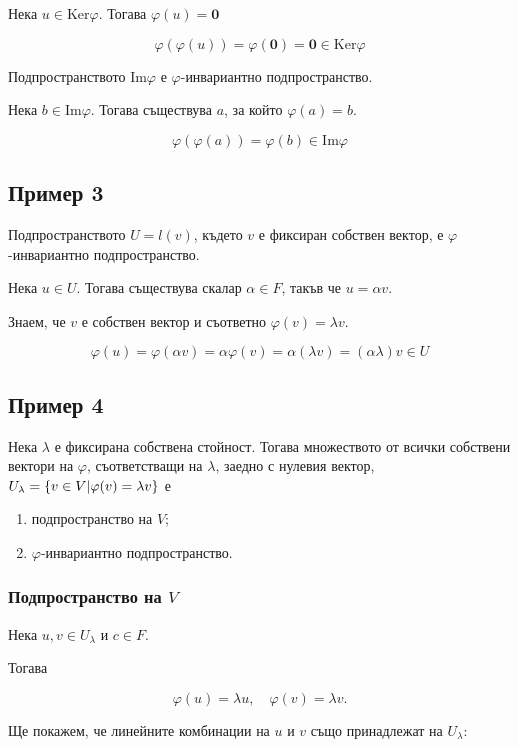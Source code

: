 \documentclass{scrartcl}
\begin{document}
\begin{FlushLeft}
Нека $u \in \text{Ker}\varphi$. Тогава $\varphi(u) = \mathbf{0}$

$$\varphi(\varphi(u)) = \varphi(\mathbf{0}) = \mathbf{0} \in \text{Ker}\varphi$$

Подпространството $\text{Im}\varphi$ е $\varphi$-инвариантно подпространство.

Нека $b \in \text{Im}\varphi$. Тогава съществува $a$, за който $\varphi(a) = b$.

$$\varphi(\varphi(a)) = \varphi(b) \in \text{Im}\varphi$$

\subsection*{Пример 3}

Подпространството $U = l(v)$, където $v$ е фиксиран собствен вектор, е $\varphi$-инвариантно подпространство.

Нека $u \in U$. Тогава съществува скалар $\alpha \in F$, такъв че $u = \alpha v$.

Знаем, че $v$ е собствен вектор и съответно $\varphi(v) = \lambda v$.

$$\varphi(u) = \varphi(\alpha v) = \alpha\varphi(v) = \alpha(\lambda v) = (\alpha\lambda)v \in U$$

\subsection*{Пример 4}

Нека $\lambda$ е фиксирана собствена стойност. Тогава множеството от всички собствени вектори на $\varphi$, съответстващи на $\lambda$, заедно с нулевия вектор, $U_{\lambda} = \{v \in V \space | \space \varphi(v) = \lambda v\}$ е \begin{enumerate}
    \item подпространство на $V$;
    \item $\varphi$-инвариантно подпространство.
\end{enumerate}

\subsubsection*{Подпространство на $V$}

Нека $u, v \in U_\lambda$ и $c \in F$.

Тогава

\[
\varphi(u) = \lambda u, \quad \varphi(v) = \lambda v.
\]

Ще покажем, че линейните комбинации на $u$ и $v$ също принадлежат на $U_\lambda$:


\end{FlushLeft}
\end{document}
